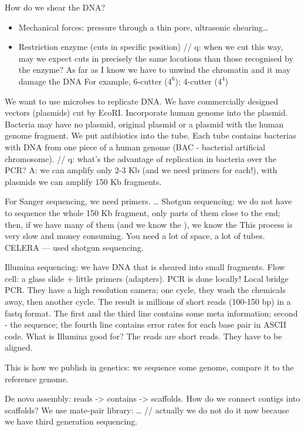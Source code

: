 \documentclass[main.tex]{subfiles}
\begin{document}
How do we shear the DNA?
\begin{itemize}[noitemsep]
    \item Mechanical forces: pressure through a thin pore, ultrasonic shearing…
    \item Restriction enzyme (cuts in specific position) // q: when we cut this way, may we expect cuts in precisely the same locations than those recognised by the enzyme? As far as I know we have to unwind the chromatin and it may damage the DNA
    For example, 6-cutter ($ 4^6 $); 4-cutter ($ 4^4 $) %
\end{itemize}

We want to use microbes to replicate DNA. We have commercially designed vectors (plasmids) cut by EcoRI.
Incorporate human genome into the plasmid. Bacteria may have no plasmid, original plasmid or a plasmid with the human genome fragment. We put antibiotics into the tube. Each tube contains bacterias with DNA from one piece of a human genome (BAC - bacterial artificial chromosome).
// q: what’s the advantage of replication in bacteria over the PCR? A: we can amplify only 2-3 Kb (and we need primers for each!), with plasmids we can amplify 150 Kb fragments.

For Sanger sequencing, we need primers.
…
Shotgun sequencing: we do not have to sequence the whole 150 Kb fragment, only parts of them close to the end; then, if we have many of them (and we know the ), we know the
This process is very slow and money consuming.
You need a lot of space, a lot of tubes.
CELERA — used shotgun sequencing.

Illumina sequencing: we have DNA that is sheared into small fragments.
Flow cell: a glass slide + little primers (adapters).
PCR is done locally! Local bridge PCR.
They have a high resolution camera; one cycle, they wash the chemicals away, then another cycle.
The result is millions of short reads (100-150 bp) in a fastq format. The first and the third line contains some meta information; second - the sequence; the fourth line contains error rates for each base pair in ASCII code.
What is Illumina good for? The reads are short reads. They have to be aligned.

This is how we publish in genetics: we sequence some genome, compare it to the reference genome.

De novo assembly: reads -> contains -> scaffolds.
How do we connect contigs into scaffolds? We use mate-pair library: … // actually we do not do it now because we have third generation sequencing.
\end{document}
